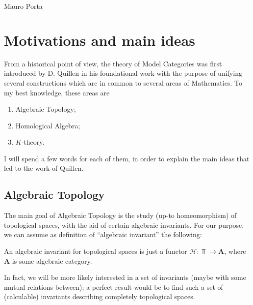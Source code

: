 \begin{refsection}
\begin{flushright}
Mauro Porta
\end{flushright}

\section{Motivations and main ideas}

From a historical point of view, the theory of Model Categories was first introduced by D. Quillen in his foundational work \cite{quillen} with the purpose of unifying several constructions which are in common to several areas of Mathematics. To my best knowledge, these areas are
\begin{enumerate}
\item Algebraic Topology;
\item Homological Algebra;
\item $K$-theory.
\end{enumerate}
I will spend a few words for each of them, in order to explain the main ideas that led to the work of Quillen.

\subsection{Algebraic Topology} \label{algebraic topology}

The main goal of Algebraic Topology is the study (up-to homeomorphism) of topological spaces, with the aid of certain algebraic invariants. For our purpose, we can assume as definition of ``algebraic invariant'' the following:
\begin{defin} \label{algebraic invariant}
An algebraic invariant for topological spaces is just a functor $\mathcal H \colon \Top \to \mathbf A$, where $\mathbf A$ is some algebraic category.
\end{defin}
In fact, we will be more likely interested in a set of invariants (maybe with some mutual relations between); a perfect result would be to find such a set of (calculable) invariants describing completely topological spaces.


\end{refsection}
